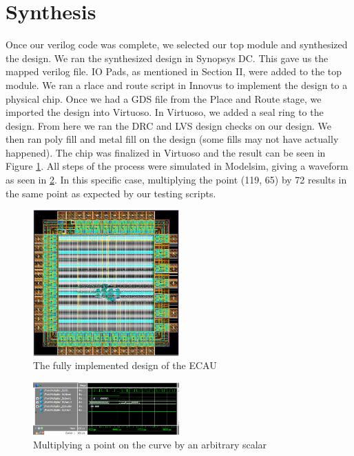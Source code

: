 \documentclass{IEEEtran}
\begin{document}
\section{Synthesis}

Once our verilog code was complete, we selected our top module and synthesized the design. We ran the synthesized design in Synopsys DC. This gave us the mapped verilog file. IO Pads, as mentioned in Section II, were added to the top module. We ran a rlace and route script in Innovus to implement the design to a physical chip. Once we had a GDS file from the Place and Route stage, we imported the design into Virtuoso. In Virtuoso, we added a seal ring to the design. From here we ran the DRC and LVS design checks on our design. We then ran poly fill and metal fill on the design (some fills may not have actually happened). The chip was finalized in Virtuoso and the result can be seen in Figure \ref{chip}. All steps of the process were simulated in Modelsim, giving a waveform as seen in \ref{sim}. In this specific case, multiplying the point (119, 65) by 72 results in the same point as expected by our testing scripts.

\begin{figure}%
\centering
\captionsetup{justification=centering}
\includegraphics[width=0.5\textwidth]{images/chip.png}
\caption{The fully implemented design of the ECAU}
\label{chip}
\end{figure}

\begin{figure}%
\centering
\captionsetup{justification=centering}
\includegraphics[width=0.5\textwidth]{images/simulation.png}
\caption{Multiplying a point on the curve by an arbitrary scalar}
\label{sim}
\end{figure}
\end{document}

